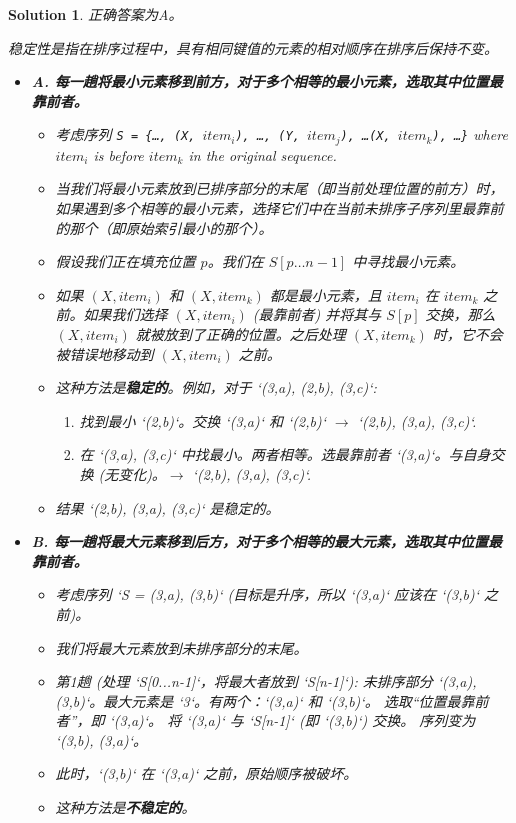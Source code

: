 \documentclass[UTF8]{report}
\newtheorem{solution}{Solution}
\theoremstyle{MyLineTheoremStyle} %
\theoremstyle{MyBlockTheoremStyle} %
\theoremstyle{MySubsubsectionStyle} %
\begin{document}
\begin{solution}
正确答案为A。

稳定性是指在排序过程中，具有相同键值的元素的相对顺序在排序后保持不变。

\begin{itemize}
    \item \textbf{A. 每一趟将最小元素移到前方，对于多个相等的最小元素，选取其中位置最靠前者。}
    \begin{itemize}
        \item 考虑序列 \texttt{S = \{\ldots, (X, $item_i$), \ldots, (Y, $item_j$), \ldots (X, $item_k$), \ldots\}} where $item_i$ is before $item_k$ in the original sequence.
        \item 当我们将最小元素放到已排序部分的末尾（即当前处理位置的前方）时，如果遇到多个相等的最小元素，选择它们中在当前未排序子序列里最靠前的那个（即原始索引最小的那个）。
        \item 假设我们正在填充位置 $p$。我们在 $S[p \ldots n-1]$ 中寻找最小元素。
        \item 如果 $(X, item_i)$ 和 $(X, item_k)$ 都是最小元素，且 $item_i$ 在 $item_k$ 之前。如果我们选择 $(X, item_i)$ (最靠前者) 并将其与 $S[p]$ 交换，那么 $(X, item_i)$ 就被放到了正确的位置。之后处理 $(X, item_k)$ 时，它不会被错误地移动到 $(X, item_i)$ 之前。
        \item 这种方法是\textbf{稳定的}。例如，对于 `{(3,a), (2,b), (3,c)}`:
        \begin{enumerate}
            \item 找到最小 `(2,b)`。交换 `(3,a)` 和 `(2,b)` $\rightarrow$ `{(2,b), (3,a), (3,c)}`.
            \item 在 `{(3,a), (3,c)}` 中找最小。两者相等。选最靠前者 `(3,a)`。与自身交换 (无变化)。$\rightarrow$ `{(2,b), (3,a), (3,c)}`.
        \end{enumerate}
        \item 结果 `{(2,b), (3,a), (3,c)}` 是稳定的。
    \end{itemize}

    \item \textbf{B. 每一趟将最大元素移到后方，对于多个相等的最大元素，选取其中位置最靠前者。}
    \begin{itemize}
        \item 考虑序列 `S = {(3,a), (3,b)}` (目标是升序，所以 `(3,a)` 应该在 `(3,b)` 之前)。
        \item 我们将最大元素放到未排序部分的末尾。
        \item 第1趟 (处理 `S[0...n-1]`，将最大者放到 `S[n-1]`):
        未排序部分 `{(3,a), (3,b)}`。最大元素是 `3`。有两个：`(3,a)` 和 `(3,b)`。
        选取“位置最靠前者”，即 `(3,a)`。
        将 `(3,a)` 与 `S[n-1]` (即 `(3,b)`) 交换。
        序列变为 `{(3,b), (3,a)}`。
        \item 此时，`(3,b)` 在 `(3,a)` 之前，原始顺序被破坏。
        \item 这种方法是\textbf{不稳定的}。
    \end{itemize}


\end{itemize}
\end{solution}
\end{document}
